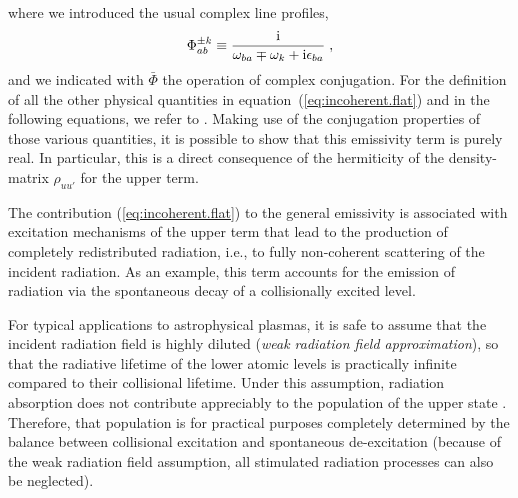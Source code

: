 \documentclass[preprint]{aastex}
\newcommand{\<}{{\kern-5pt}}
\begin{document}
%
where we introduced the usual complex line profiles,
%
\begin{displaymath} \label{eq:Phi}
\Phi_{ab}^{\pm k} 
\equiv \frac{\rm i}{\omega_{ba}\mp\omega_k+{\rm i}\epsilon_{ba}}\;,
\end{displaymath}
%
and we indicated with $\bar\Phi$ the operation of complex conjugation.
%
For the definition of all the other physical quantities in 
equation~(\ref{eq:incoherent.flat})
and in the following equations, we refer to \cite{Ca14}.
%
Making use of the conjugation properties of those various quantities, it is
possible to show that this emissivity term is purely real. In
particular, this is a direct consequence of the hermiticity of the
density-matrix $\rho_{uu'}$ for the upper term.

The contribution (\ref{eq:incoherent.flat}) to the general emissivity is associated with 
excitation mechanisms of the upper term that lead to the production of completely 
redistributed radiation, i.e., to fully non-coherent scattering of the incident 
radiation. As
an example, this term accounts for the emission of radiation via the spontaneous 
decay of a collisionally excited level.

For typical applications to astrophysical plasmas, it is safe to assume
that the incident radiation field is highly diluted (\emph{weak radiation
field approximation}), so that the radiative lifetime of the lower
atomic levels is practically infinite compared to their collisional 
lifetime. 
%
Under this assumption, radiation absorption does not contribute
appreciably to the population of the upper state \citep{Ca14}. 
Therefore, that population is for practical purposes completely determined by 
the balance between collisional excitation and spontaneous de-excitation 
(because of the weak radiation
field assumption, all stimulated radiation processes can also be neglected).
\end{document}
